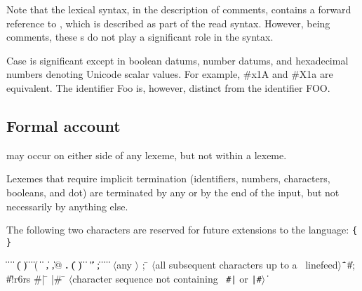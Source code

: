 Note that the lexical syntax, in the description of comments, contains
a forward reference to , which is described as part of the
read syntax.  However, being comments, these s do not play
a significant role in the syntax.

Case is significant except in boolean datums, number datums, and
hexadecimal numbers denoting Unicode scalar values.  For example, {\cf \#x1A}
and {\cf \#X1a} are equivalent.  The identifier {\cf Foo} is, however,
distinct from the identifier {\cf FOO}.

\subsection{Formal account}
\label{lexicalgrammarsection}

 may occur on either side of any lexeme, but not
within a lexeme.

\vest Lexemes that require implicit termination (identifiers, numbers,
characters, booleans, and dot) are terminated by any 
or by the end of the input, but not necessarily by anything else.

The following two characters are reserved for future extensions to the
language: {\tt \verb"{" \verb"}"}

\begin{grammar}%
 \:  \|  \| 
\>  \|  \| 
\>  \| ( \| ) \| \openbracket{} \| \closedbracket{} \| \sharpsign( \| \singlequote{} \| \backquote{} \| , \| ,@ \| {\bf.}
 \:  \| ( \| ) \| \openbracket{} \| \closedbracket{} \| " \| ;
 \:  \| 
\> \|  \|  
\> \| 
 \: $\langle${\rm any }
\> $\rangle$
 \: ; \= $\langle$\rm all subsequent characters up to a
                    \>\ \rm linefeed$\rangle$
\qquad \= \| 
\> \| \#; 
\> \| \#!r6rs
 \: \#| \= 
\>  |\#
 \: \= $\langle$\rm character sequence not containing
\>\ \rm {\tt \#|} or {\tt |\#}$\rangle$
 \:  
 \:  \| 
 \: %
\end{grammar}

